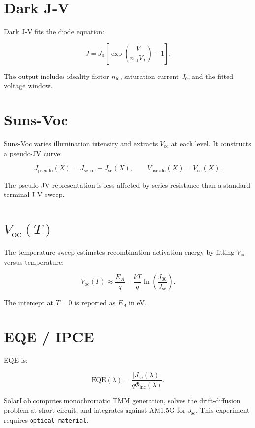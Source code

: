 \documentclass[
  11pt,
  american,
]{report}
\begin{document}
\hypertarget{dark-j-v}{%
\section{Dark J-V}\label{dark-j-v}}

Dark J-V fits the diode equation:

\[
J=J_0\left[\exp\left(\frac{V}{n_\mathrm{id}V_T}\right)-1\right].
\]

The output includes ideality factor \(n_\mathrm{id}\), saturation
current \(J_0\), and the fitted voltage window.

\hypertarget{suns-voc}{%
\section{Suns-Voc}\label{suns-voc}}

Suns-Voc varies illumination intensity and extracts \(V_\mathrm{oc}\) at
each level. It constructs a pseudo-JV curve:

\[
J_\mathrm{pseudo}(X)
=J_{\mathrm{sc,ref}}-J_\mathrm{sc}(X),
\qquad
V_\mathrm{pseudo}(X)=V_\mathrm{oc}(X).
\]

The pseudo-JV representation is less affected by series resistance than
a standard terminal J-V sweep.

\hypertarget{v_mathrmoct}{%
\section{\texorpdfstring{\(V_\mathrm{oc}(T)\)}{V\_\textbackslash mathrm\{oc\}(T)}}\label{v_mathrmoct}}

The temperature sweep estimates recombination activation energy by
fitting \(V_\mathrm{oc}\) versus temperature:

\[
V_\mathrm{oc}(T)
\approx
\frac{E_A}{q}
-
\frac{kT}{q}
\ln\left(\frac{J_{00}}{J_\mathrm{sc}}\right).
\]

The intercept at \(T=0\) is reported as \(E_A\) in eV.

\hypertarget{eqe-ipce}{%
\section{EQE / IPCE}\label{eqe-ipce}}

EQE is:

\[
\mathrm{EQE}(\lambda)
=
\frac{|J_\mathrm{sc}(\lambda)|}
{q\Phi_\mathrm{inc}(\lambda)}.
\]

SolarLab computes monochromatic TMM generation, solves the
drift-diffusion problem at short circuit, and integrates against AM1.5G
for \(J_\mathrm{sc}\). This experiment requires
\texttt{optical\_material}.
\end{document}

